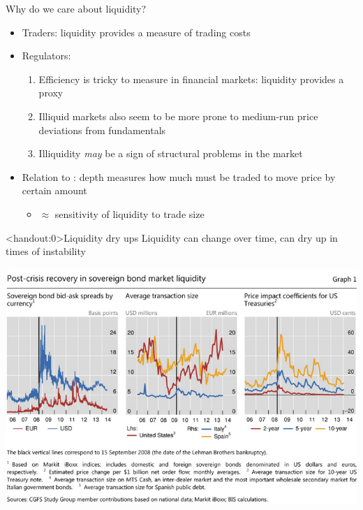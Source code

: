 \documentclass[english,10pt
,aspectratio=169
]{beamer}
\begin{document}
\begin{frame}{Why do we care about liquidity?}
\begin{itemize}
	\item Traders: liquidity provides a measure of trading costs
	\item Regulators:
	\begin{enumerate}
		\item Efficiency is tricky to measure in financial markets: liquidity provides a proxy
		\item Illiquid markets also seem to be more prone to medium-run price deviations from fundamentals
		\item Illiquidity \textit{may} be a sign of structural problems in the market
	\end{enumerate}
	\item Relation to : depth measures how much must be traded to move price by certain amount
	\begin{itemize}
		\item $\approx$ sensitivity of liquidity to trade size
	\end{itemize}
\end{itemize}
\end{frame}


\begin{frame}<handout:0>{Liquidity dry ups}
	Liquidity can change over time, can dry up in times of instability
	\begin{center}
		\includegraphics[scale=0.5]{pics/L2_liquiditylehman}
	\end{center}
\end{frame}
\end{document}
